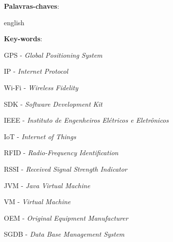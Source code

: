 
\setlength{\absparsep}{18pt} %
\begin{resumo}


    \textbf{Palavras-chaves}:

\end{resumo}

\begin{resumo}[Abstract]
    \begin{otherlanguage*}{english}

        \vspace{\onelineskip}

        \noindent
        \textbf{Key-words}:
    \end{otherlanguage*}
\end{resumo}


\listoffigures*


\begin{siglas}

    \item GPS - \textit{Global Positioning System}
    \item IP - \textit{Internet Protocol}
    \item Wi-Fi - \textit{Wireless Fidelity}
    \item SDK - \textit{Software Development Kit}
    \item IEEE - \textit{Instituto de Engenheiros Elétricos e Eletrônicos}
    \item IoT - \textit{Internet of Things}
    \item RFID - \textit{Radio-Frequency Identification}
    \item RSSI - \textit{Received Signal Strength Indicator}
    \item JVM - \textit{Java Virtual Machine}
    \item VM - \textit{Virtual Machine}
    \item OEM - \textit{Original Equipment Manufacturer}
    \item SGDB - \textit{Data Base Management System}

\end{siglas}


\tableofcontents*
\cleardoublepage


